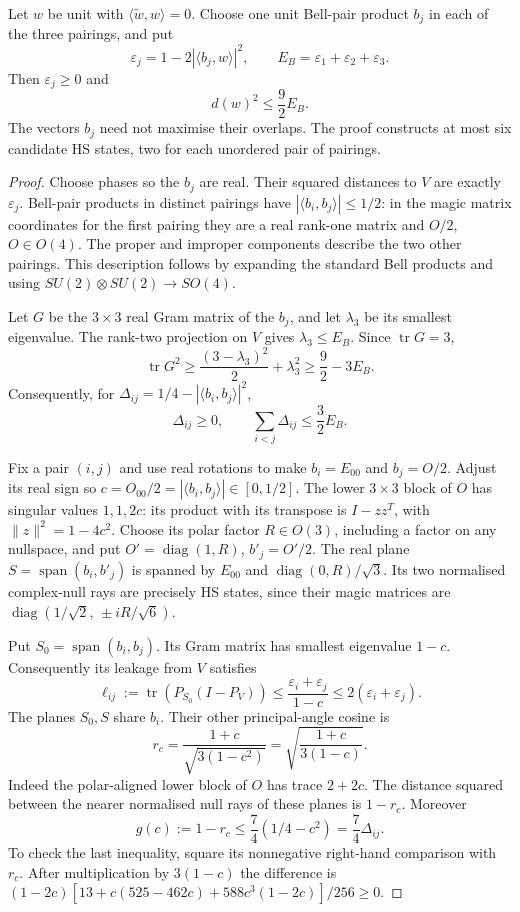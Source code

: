 \begin{proposition}\label{prop:fqe-bell-frame}
Let $w$ be unit with $\langle\tilde w,w\rangle=0$. Choose one unit
Bell-pair product $b_j$ in each of the three pairings, and put
\[
 \varepsilon_j=1-2|\langle b_j,w\rangle|^2,\qquad
 E_B=\varepsilon_1+\varepsilon_2+\varepsilon_3.
\]
Then $\varepsilon_j\ge0$ and
\[
 \boxed{\quad d(w)^2\le\frac92 E_B.\quad}
\]
The vectors $b_j$ need not maximise their overlaps. The proof constructs
at most six candidate HS states, two for each unordered pair of pairings.
\end{proposition}
\begin{proof}
Choose phases so the $b_j$ are real. Their squared distances to $V$ are
exactly $\varepsilon_j$. Bell-pair products in distinct pairings have
$|\langle b_i,b_j\rangle|\le1/2$: in the magic matrix coordinates for
the first pairing they are a real rank-one matrix and $O/2$, $O\in O(4)$.
The proper and improper components describe the two other pairings.
This description follows by expanding the standard Bell products and
using $SU(2)\otimes SU(2)\to SO(4)$.

Let $G$ be the $3\times3$ real Gram matrix of the $b_j$, and let
$\lambda_3$ be its smallest eigenvalue. The rank-two projection on $V$
gives $\lambda_3\le E_B$. Since $\operatorname{tr}G=3$,
\[
 \operatorname{tr}G^2\ge\frac{(3-\lambda_3)^2}{2}+\lambda_3^2
                     \ge\frac92-3E_B.
\]
Consequently, for $\Delta_{ij}=1/4-|\langle b_i,b_j\rangle|^2$,
\begin{equation}\label{eq:fqe-bell-gram}
 \Delta_{ij}\ge0,\qquad \sum_{i<j}\Delta_{ij}\le\frac32 E_B.
\end{equation}

Fix a pair $(i,j)$ and use real rotations to make $b_i=E_{00}$
and $b_j=O/2$. Adjust its real sign so
$c=O_{00}/2=|\langle b_i,b_j\rangle|\in[0,1/2]$.
The lower $3\times3$ block of $O$ has singular values $1,1,2c$:
its product with its transpose is $I-zz^T$, with $\|z\|^2=1-4c^2$.
Choose its polar factor $R\in O(3)$, including a factor on any nullspace,
and put $O'=\operatorname{diag}(1,R)$, $b'_j=O'/2$.
The real plane $S=\operatorname{span}(b_i,b'_j)$ is spanned by
$E_{00}$ and $\operatorname{diag}(0,R)/\sqrt3$. Its two normalised
complex-null rays are precisely HS states, since their magic matrices
are $\operatorname{diag}(1/\sqrt2,\,\pm iR/\sqrt6)$.

Put $S_0=\operatorname{span}(b_i,b_j)$. Its Gram matrix has
smallest eigenvalue $1-c$.
Consequently its leakage from $V$ satisfies
\[
 \ell_{ij}:=\operatorname{tr}(P_{S_0}(I-P_V))
 \le\frac{\varepsilon_i+\varepsilon_j}{1-c}
 \le2(\varepsilon_i+\varepsilon_j).
\]
The planes $S_0,S$ share $b_i$. Their other principal-angle cosine is
\[
 r_c=\frac{1+c}{\sqrt{3(1-c^2)}}
     =\sqrt{\frac{1+c}{3(1-c)}}.
\]
Indeed the polar-aligned lower block of $O$ has trace $2+2c$.
The distance squared between the nearer normalised null rays of these
planes is $1-r_c$. Moreover
\[
 g(c):=1-r_c\le\frac74(1/4-c^2)=\frac74\Delta_{ij}.
\]
To check the last inequality, square its nonnegative right-hand
comparison with $r_c$. After multiplication by $3(1-c)$ the difference
is
$(1-2c)[13+c(525-462c)+588c^3(1-2c)]/256\ge0$.


\end{proof}
